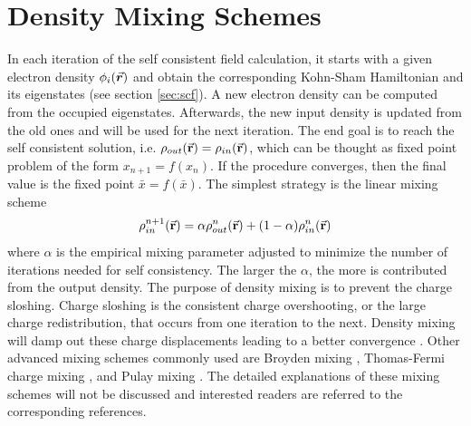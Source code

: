 \section{Density Mixing Schemes}
In each iteration of the self consistent field calculation, it starts with a given electron density $\phi_i(\va*{r})$ and obtain the corresponding Kohn-Sham Hamiltonian and its eigenstates (see section \ref{sec:scf}). A new electron density can be computed from the occupied eigenstates. Afterwards, the new input density is updated from the old ones and will be used for the next iteration. The end goal is to reach the self consistent solution, i.e. $\rho_{out}({\va{r}}) = \rho_{in}({\va{r}})$, which can be thought as fixed point problem of the form $x_{n+1} = f(x_n)$. If the procedure converges, then the final value is the fixed point $\bar{x} = f(\bar{x})$. The simplest strategy is the linear mixing  scheme \citep{Kerker1981}
\begin{equation}
	\rho_{in}^{n+1}({\va{r}}) = \alpha \rho_{out}^{n}({\va{r}}) + (1 - \alpha) \rho_{in}^{n}({\va{r}})
\end{equation}
where $\alpha$ is the empirical mixing parameter adjusted to minimize the number of iterations needed for self consistency. The larger the $\alpha$, the more is contributed from the output density. The purpose of density mixing is to prevent the charge sloshing. Charge sloshing is the consistent charge overshooting, or the  large charge redistribution, that occurs from one iteration to the next. Density mixing will damp out these charge displacements leading to a better convergence \citep{Johnson1988}. Other advanced mixing schemes commonly used are Broyden mixing \citep{Broyden1965}, Thomas-Fermi charge mixing \citep{Raczkowski2001}, and Pulay mixing \citep{Pulay1980, Kresse1996}. The detailed explanations of these mixing schemes will not be discussed and interested readers are referred to the corresponding references.

